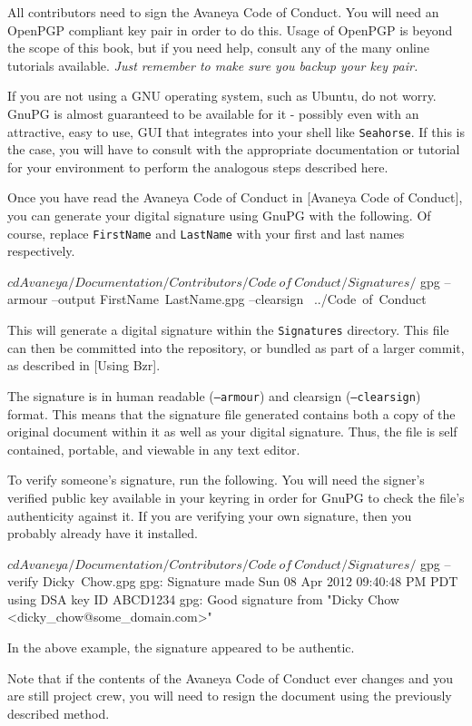

All contributors need to sign the Avaneya Code of Conduct. You will need an OpenPGP compliant key pair in order to do this. Usage of OpenPGP is beyond the scope of this book, but if you need help, consult any of the many online tutorials available. {\it Just remember to make sure you backup your key pair.}

If you are not using a GNU operating system, such as Ubuntu, do not worry. GnuPG is almost guaranteed to be available for it - possibly even with an attractive, easy to use, GUI that integrates into your shell like {\tt Seahorse}. If this is the case, you will have to consult with the appropriate documentation or tutorial for your environment to perform the analogous steps described here.

Once you have read the Avaneya Code of Conduct in [Avaneya Code of Conduct], you can generate your digital signature using GnuPG with the following. Of course, replace {\tt FirstName} and {\tt LastName} with your first and last names respectively.

\startCodeExample
$ cd Avaneya/Documentation/Contributors/Code\ of\ Conduct/Signatures/
$ gpg --armour --output FirstName\ LastName.gpg --clearsign \
    ../Code\ of\ Conduct
\stopCodeExample

This will generate a digital signature within the {\tt Signatures} directory. This file can then be committed into the repository, or bundled as part of a larger commit, as described in [Using Bzr]. 

The signature is in human readable ({\tt --armour}) and clearsign ({\tt --clearsign}) format. This means that the signature file generated contains both a copy of the original document within it as well as your digital signature. Thus, the file is self contained, portable, and viewable in any text editor.

To verify someone's signature, run the following. You will need the signer's verified public key available in your keyring in order for GnuPG to check the file's authenticity against it. If you are verifying your own signature, then you probably already have it installed.

\startCodeExample
$ cd Avaneya/Documentation/Contributors/Code\ of\ Conduct/Signatures/
$ gpg --verify Dicky\ Chow.gpg 
gpg: Signature made Sun 08 Apr 2012 09:40:48 PM PDT using DSA key ID ABCD1234
gpg: Good signature from "Dicky Chow <dicky_chow@some_domain.com>"
\stopCodeExample

In the above example, the signature appeared to be authentic.

Note that if the contents of the Avaneya Code of Conduct ever changes and you are still project crew, you will need to resign the document using the previously described method.

